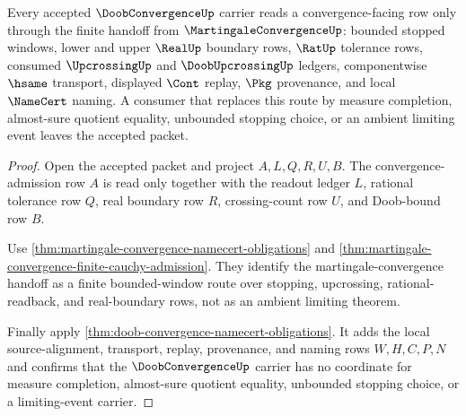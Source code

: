 \begin{theorem}
\label{thm:doob-convergence-bounded-readout-nonescape}
Every accepted $\DoobConvergenceUp$ carrier reads a convergence-facing row only through the finite handoff from $\MartingaleConvergenceUp$: bounded stopped windows, lower and upper $\RealUp$ boundary rows, $\RatUp$ tolerance rows, consumed $\UpcrossingUp$ and $\DoobUpcrossingUp$ ledgers, componentwise $\hsame$ transport, displayed $\Cont$ replay, $\Pkg$ provenance, and local $\NameCert$ naming. A consumer that replaces this route by measure completion, almost-sure quotient equality, unbounded stopping choice, or an ambient limiting event leaves the accepted packet.
\end{theorem}
\begin{proof}
Open the accepted packet and project $A,L,Q,R,U,B$. The convergence-admission row $A$ is read only together with the readout ledger $L$, rational tolerance row $Q$, real boundary row $R$, crossing-count row $U$, and Doob-bound row $B$.

Use \autoref{thm:martingale-convergence-namecert-obligations} and \autoref{thm:martingale-convergence-finite-cauchy-admission}. They identify the martingale-convergence handoff as a finite bounded-window route over stopping, upcrossing, rational-readback, and real-boundary rows, not as an ambient limiting theorem.

Finally apply \autoref{thm:doob-convergence-namecert-obligations}. It adds the local source-alignment, transport, replay, provenance, and naming rows $W,H,C,P,N$ and confirms that the $\DoobConvergenceUp$ carrier has no coordinate for measure completion, almost-sure quotient equality, unbounded stopping choice, or a limiting-event carrier.
\end{proof}


\begin{closurestatus}{\DoobConvergenceUp}
  \theoryclosure{\seedClosure}
  \formalstatus{\unformalizedV}
\end{closurestatus}
